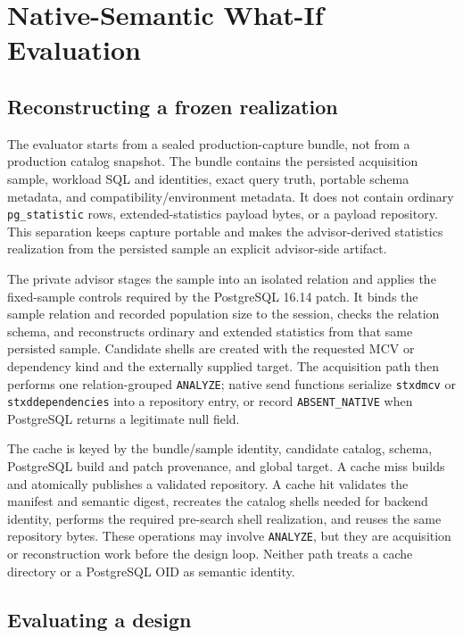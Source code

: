 \section{Native-Semantic What-If Evaluation}
\label{sec:native-eval}

\subsection{Reconstructing a frozen realization}

The evaluator starts from a sealed production-capture bundle, not from a
production catalog snapshot.  The bundle contains the persisted acquisition
sample, workload SQL and identities, exact query truth, portable schema
metadata, and compatibility/environment metadata.  It does not contain
ordinary \texttt{pg\_statistic} rows, extended-statistics payload bytes, or a
payload repository.  This separation keeps capture portable and makes the
advisor-derived statistics realization from the persisted sample an explicit
advisor-side artifact.

The private advisor stages the sample into an isolated relation and applies
the fixed-sample controls required by the PostgreSQL 16.14 patch.  It binds
the sample relation and recorded population size to the session, checks the
relation schema, and reconstructs ordinary and extended statistics from that
same persisted sample.  Candidate shells are created with the requested MCV
or dependency kind and the externally supplied target.  The acquisition path
then performs one relation-grouped \texttt{ANALYZE}; native send functions
serialize \texttt{stxdmcv} or \texttt{stxddependencies} into a repository
entry, or record \texttt{ABSENT\_NATIVE} when PostgreSQL returns a legitimate
null field.

The cache is keyed by the bundle/sample identity, candidate catalog, schema,
PostgreSQL build and patch provenance, and global target.  A cache miss builds
and atomically publishes a validated repository.  A cache hit validates the
manifest and semantic digest, recreates the catalog shells needed for backend
identity, performs the required pre-search shell realization, and reuses the
same repository bytes.  These operations may involve \texttt{ANALYZE}, but
they are acquisition or reconstruction work before the design loop.  Neither
path treats a cache directory or a PostgreSQL OID as semantic identity.

\subsection{Evaluating a design}

